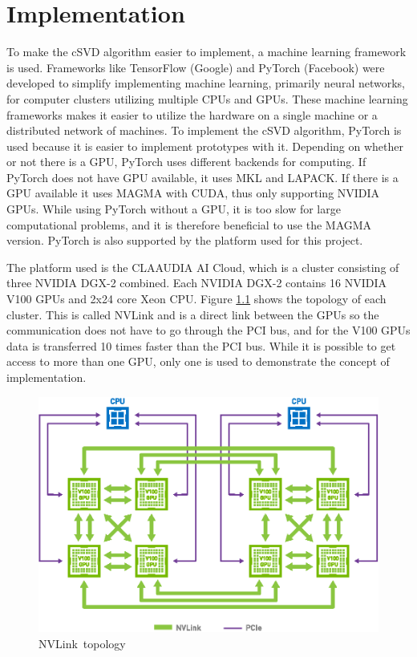\chapter{Implementation}

To make the cSVD algorithm easier to implement, a machine learning framework is used. Frameworks like TensorFlow (Google) and PyTorch (Facebook) were developed to simplify implementing machine learning, primarily neural networks, for computer clusters utilizing multiple CPUs and GPUs. These machine learning frameworks makes it easier to utilize the hardware on a single machine or a distributed network of machines. To implement the cSVD algorithm, PyTorch is used because it is easier to implement prototypes with it.  Depending on whether or not there is a GPU, PyTorch uses different backends for computing. If PyTorch does not have GPU available, it uses MKL and LAPACK. If there is a GPU available it uses MAGMA with CUDA, thus only supporting NVIDIA GPUs. While using PyTorch without a GPU, it is too slow for large computational problems, and it is therefore beneficial to use the MAGMA version. PyTorch is also supported by the platform used for this project.

The platform used is the CLAAUDIA AI Cloud, which is a cluster consisting of three NVIDIA DGX-2 combined. Each NVIDIA DGX-2 contains 16 NVIDIA V100 GPUs and 2x24 core Xeon CPU. Figure \ref{fig:nvlink} shows the topology of each cluster. This is called NVLink and is a direct link between the GPUs so the communication does not have to go through the PCI bus, and for the V100 GPUs data is transferred 10 times faster than the PCI bus. While it is possible to get access to more than one GPU, only one is used to demonstrate the concept of implementation.

\begin{figure}[H]
  \centering
  \includegraphics[scale=0.7]{Figures/nvlink.eps}
  \caption[]{NVLink\protect\footnotemark\ topology}
  \label{fig:nvlink}
\end{figure}
  
